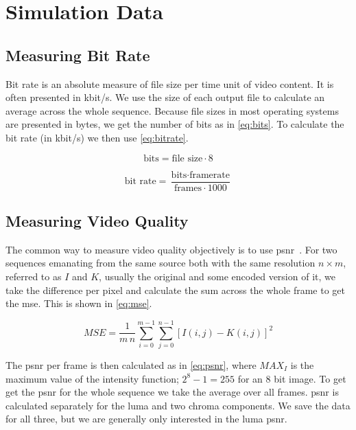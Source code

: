\section{Simulation Data}
\subsection{Measuring Bit Rate}
Bit rate is an absolute measure of file size per time unit of video content. It is often presented in \gls{kbit/s}. We use the size of each output file to calculate an average across the whole sequence. Because file sizes in most operating systems are presented in bytes, we get the number of bits as in \cref{eq:bits}. To calculate the bit rate (in \gls{kbit/s}) we then use \cref{eq:bitrate}.

\begin{equation}
\label{eq:bits}
\text{bits} = \text{file size} \cdot 8
\end{equation}

\begin{equation}
\label{eq:bitrate}
\text{bit rate} = \frac{\text{bits} \cdot \text{framerate}}{\text{frames} \cdot 1000}
\end{equation}

\subsection{Measuring Video Quality}
The common way to measure video quality objectively is to use \gls{psnr}~\cite{Wien_Coding_Tools}. For two sequences emanating from the same source both with the same resolution $n \times m$, referred to as $I$ and $K$, usually the original and some encoded version of it, we take the difference per pixel and calculate the sum across the whole frame to get the \gls{mse}. This is shown in \cref{eq:mse}.

\begin{equation}
\label{eq:mse}
{MSE} = \frac{1}{m\,n}\sum_{i=0}^{m-1}\sum_{j=0}^{n-1} [I(i,j) - K(i,j)]^2
\end{equation}

The \gls{psnr} per frame is then calculated as in \cref{eq:psnr}, where $MAX_I$ is the maximum value of the intensity function; $2^8 - 1 = 255$ for an 8 bit image. To get get the \gls{psnr} for the whole sequence we take the average over all frames. \gls{psnr} is calculated separately for the luma and two chroma components. We save the data for all three, but we are generally only interested in the luma \gls{psnr}.

